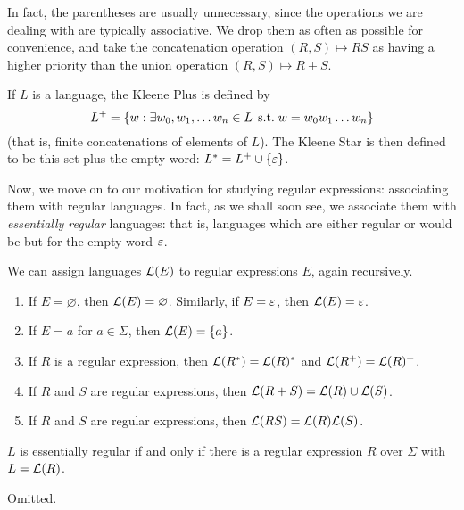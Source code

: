 \documentclass{article}
\begin{document}
In fact, the parentheses are usually unnecessary, since the operations we are dealing with are typically associative. We drop them as often as possible for convenience, and take the concatenation operation $(R, S) \mapsto RS$ as having a higher priority than the union operation $(R, S) \mapsto R + S$.

\begin{definition}
	If $L$ is a language, the Kleene Plus is defined by
	\[
		L^+ = \left\lbrace w: \exists w_0, w_1, \dots w_n \in L \mathrel{\, \text{s.t.}} w = w_0w_1\dots w_n \right\rbrace
	\]
	(that is, finite concatenations of elements of $L$). The Kleene Star is then defined to be this set plus the empty word: $L^* = L^+ \cup \left\lbrace \varepsilon \right\rbrace$.
\end{definition}

Now, we move on to our motivation for studying regular expressions: associating them with regular languages. In fact, as we shall soon see, we associate them with \textit{essentially regular} languages: that is, languages which are either regular or would be but for the empty word $\varepsilon$.

\begin{definition}
	We can assign languages $\mathcal{L}(E)$ to regular expressions $E$, again recursively.
	\begin{enumerate}
		\item If $E = \varnothing$, then $\mathcal{L}(E) = \varnothing$. Similarly, if $E = \varepsilon$, then $\mathcal{L}(E) = \varepsilon$.
		\item If $E = a$ for $a \in \Sigma$, then $\mathcal{L}(E) = \left\lbrace a \right\rbrace$.
		\item If $R$ is a regular expression, then $\mathcal{L}(R^*) = \mathcal{L}(R)^*$ and $\mathcal{L}(R^+) = \mathcal{L}(R)^+$.
		\item If $R$ and $S$ are regular expressions, then $\mathcal{L}(R + S) = \mathcal{L}(R) \cup \mathcal{L}(S)$.
		\item If $R$ and $S$ are regular expressions, then $\mathcal{L}(RS) = \mathcal{L}(R)\mathcal{L}(S)$.
	\end{enumerate}
\end{definition}

\begin{theorem}
	$L$ is essentially regular if and only if there is a regular expression $R$ over $\Sigma$ with $L = \mathcal{L}(R)$.
\end{theorem}

\begin{prf}
	Omitted.
\end{prf}
\end{document}
